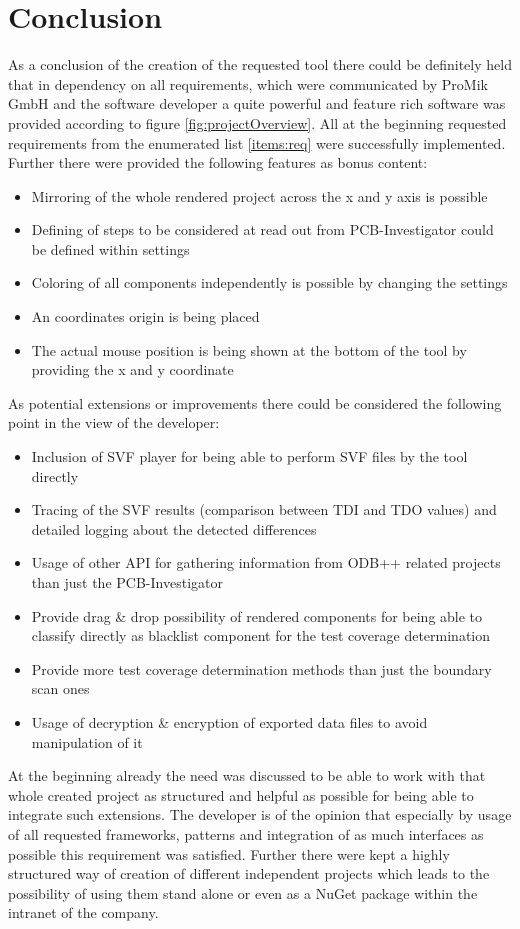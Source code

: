 \chapter{Conclusion}
As a conclusion of the creation of the requested tool there could be definitely held that in dependency on all requirements, which were communicated by ProMik GmbH and the software developer a quite powerful and feature rich software was provided according to figure \ref{fig:projectOverview}. 
All at the beginning requested requirements from the enumerated list \ref{items:req} were successfully implemented. Further there were provided the following features as bonus content:
\begin{itemize}
	\item Mirroring of the whole rendered project across the x and y axis is possible
	\item Defining of steps to be considered at read out from \ac{PCB}-Investigator could be defined within settings
	\item Coloring of all components independently is possible by changing the settings
	\item An coordinates origin is being placed
	\item The actual mouse position is being shown at the bottom of the tool by providing the x and y coordinate
\end{itemize}

As potential extensions or improvements there could be considered the following point in the view of the developer:
\begin{itemize}
	\item Inclusion of \ac{SVF} player for being able to perform \ac{SVF} files by the tool directly
	\item Tracing of the \ac{SVF} results (comparison between TDI and TDO values) and detailed logging about the detected differences
	\item Usage of other \ac{API} for gathering information from \ac{ODB}++ related projects than just the \ac{PCB}-Investigator
	\item Provide drag \& drop possibility of rendered components for being able to classify directly as blacklist component for the test coverage determination
	\item Provide more test coverage determination methods than just the boundary scan ones
	\item Usage of decryption \& encryption of exported data files to avoid manipulation of it
\end{itemize}

At the beginning already the need was discussed to be able to work with that whole created project as structured and helpful as possible for being able to integrate such extensions. The developer is of the opinion that especially by usage of all requested frameworks, patterns and integration of as much interfaces as possible this requirement was satisfied. Further there were kept a highly structured way of creation of different independent projects which leads to the possibility of using them stand alone or even as a NuGet package within the intranet of the company.